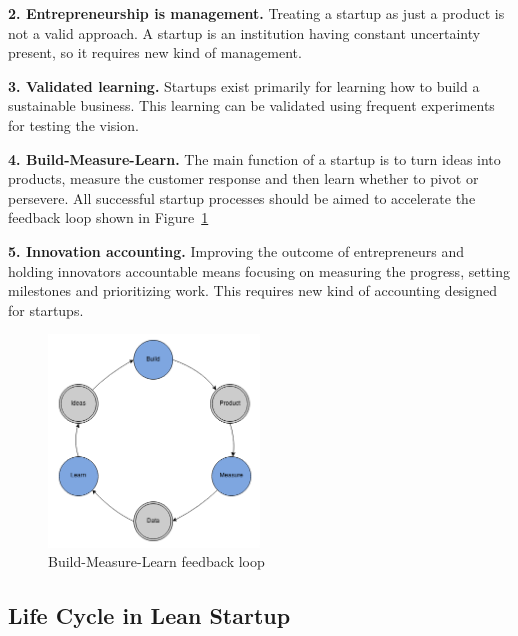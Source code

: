 \textbf{2. Entrepreneurship is management.} Treating a startup as just a product is not a valid approach. A startup is an institution having constant uncertainty present, so it requires new kind of management.

\textbf{3. Validated learning.} Startups exist primarily for learning how to build a sustainable business. This learning can be validated using frequent experiments for testing the vision.

\textbf{4. Build-Measure-Learn.} The main function of a startup is to turn ideas into products, measure the customer response and then learn whether to pivot or persevere. All successful startup processes should be aimed to accelerate the feedback loop shown in Figure~\ref{fig:feedback-loop}

\textbf{5. Innovation accounting.} Improving the outcome of entrepreneurs and holding innovators accountable means focusing on measuring the progress, setting milestones and prioritizing work. This requires new kind of accounting designed for startups.

\begin{figure}[t]
\begin{center}
\includegraphics[width=0.5\textwidth]{image/feedback-loop.png}
\end{center}
\caption{Build-Measure-Learn feedback loop}
\label{fig:feedback-loop}
\end{figure}




 \subsection{Life Cycle in Lean Startup}

